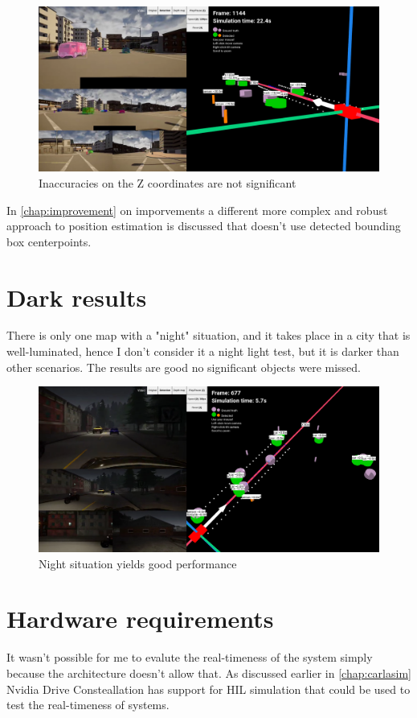 \begin{figure}[!ht]
	\centering
	\includegraphics[width=150mm, keepaspectratio]{figures/acczcoord2.png}
	\caption{Inaccuracies on the Z coordinates are not significant}
	\label{fig:acczcoord}
\end{figure}

In \autoref{chap:improvement} on imporvements a different more complex and
robust approach to position estimation is discussed that doesn't use detected
bounding box centerpoints.

\section{Dark results}
There is only one map with a "night" situation, and it takes place in a city
that is well-luminated, hence I don't consider it a night light test, but it is
darker than other scenarios. The results are good no significant objects were
missed.

\begin{figure}[!ht]
	\centering
	\includegraphics[width=150mm, keepaspectratio]{figures/nightresult.png}
	\caption{Night situation yields good performance}
	\label{fig:nightresult}
\end{figure}

\section{Hardware requirements}
It wasn't possible for me to evalute the real-timeness of the system simply
because the architecture doesn't allow that. As discussed earlier in
\autoref{chap:carlasim} Nvidia Drive Consteallation has support for HIL
simulation that could be used to test the real-timeness of systems.